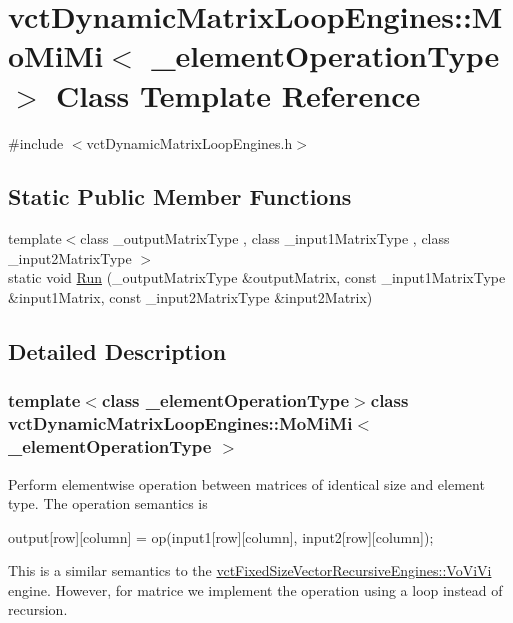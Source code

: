 \hypertarget{classvct_dynamic_matrix_loop_engines_1_1_mo_mi_mi}{\section{vct\-Dynamic\-Matrix\-Loop\-Engines\-:\-:Mo\-Mi\-Mi$<$ \-\_\-element\-Operation\-Type $>$ Class Template Reference}
\label{classvct_dynamic_matrix_loop_engines_1_1_mo_mi_mi}
}


{\ttfamily \#include $<$vct\-Dynamic\-Matrix\-Loop\-Engines.\-h$>$}

\subsection*{Static Public Member Functions}
\begin{DoxyCompactItemize}
\item 
{\footnotesize template$<$class \-\_\-output\-Matrix\-Type , class \-\_\-input1\-Matrix\-Type , class \-\_\-input2\-Matrix\-Type $>$ }\\static void \hyperlink{classvct_dynamic_matrix_loop_engines_1_1_mo_mi_mi_a5f0f3de20edf0762625afc3f31d4978d}{Run} (\-\_\-output\-Matrix\-Type \&output\-Matrix, const \-\_\-input1\-Matrix\-Type \&input1\-Matrix, const \-\_\-input2\-Matrix\-Type \&input2\-Matrix)
\end{DoxyCompactItemize}


\subsection{Detailed Description}
\subsubsection*{template$<$class \-\_\-element\-Operation\-Type$>$class vct\-Dynamic\-Matrix\-Loop\-Engines\-::\-Mo\-Mi\-Mi$<$ \-\_\-element\-Operation\-Type $>$}

Perform elementwise operation between matrices of identical size and element type. The operation semantics is 
\begin{DoxyCode}
output[row][column] = op(input1[row][column], input2[row][column]);
\end{DoxyCode}


This is a similar semantics to the \hyperlink{classvct_fixed_size_vector_recursive_engines_1_1_vo_vi_vi}{vct\-Fixed\-Size\-Vector\-Recursive\-Engines\-::\-Vo\-Vi\-Vi} engine. However, for matrice we implement the operation using a loop instead of recursion.

